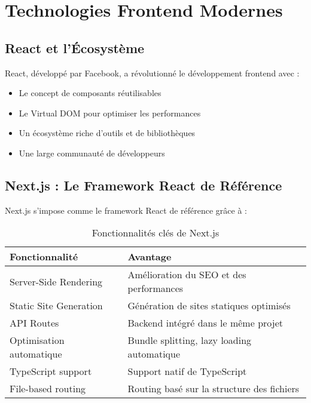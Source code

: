 \section{Technologies Frontend Modernes}

\subsection{React et l'Écosystème}

React, développé par Facebook, a révolutionné le développement frontend avec :
\begin{itemize}
    \item Le concept de composants réutilisables
    \item Le Virtual DOM pour optimiser les performances
    \item Un écosystème riche d'outils et de bibliothèques
    \item Une large communauté de développeurs
\end{itemize}

\subsection{Next.js : Le Framework React de Référence}

Next.js s'impose comme le framework React de référence grâce à :

\begin{table}[H]
    \centering
    \begin{tabularx}{\textwidth}{|X|X|}
        \hline
        \textbf{Fonctionnalité} & \textbf{Avantage} \\
        \hline
        Server-Side Rendering & Amélioration du SEO et des performances \\
        \hline
        Static Site Generation & Génération de sites statiques optimisés \\
        \hline
        API Routes & Backend intégré dans le même projet \\
        \hline
        Optimisation automatique & Bundle splitting, lazy loading automatique \\
        \hline
        TypeScript support & Support natif de TypeScript \\
        \hline
        File-based routing & Routing basé sur la structure des fichiers \\
        \hline
    \end{tabularx}
    \caption{Fonctionnalités clés de Next.js}
    \label{tab:nextjs_features}
\end{table}

